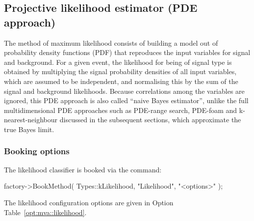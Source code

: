 \subsection{Projective likelihood estimator (PDE approach)}
\label{sec:likelihood}

The method of maximum likelihood consists of building a 
model out of probability density functions (PDF) that reproduces the input 
variables for signal and background. For a given event, the likelihood for 
being of signal type is obtained by multiplying the signal probability densities 
of all input variables, which are assumed to be independent, and normalising this 
by the sum of the signal and background likelihoods. Because correlations among 
the variables are ignored, this PDE approach is also called ``naive Bayes estimator'', 
unlike the full multidimensional PDE approaches such as PDE-range search, 
PDE-foam and k-nearest-neighbour discussed in the subsequent sections, which 
approximate the true Bayes limit. 

\subsubsection{Booking options}

The likelihood classifier is booked via the command:
\begin{codeexample}
\begin{tmvacode}
factory->BookMethod( Types::kLikelihood, "Likelihood", "<options>" );
\end{tmvacode}
\caption[.]{\codeexampleCaptionSize Booking of the (projective) likelihood classifier: 
         the first argument is the predefined enumerator, the 
         second argument is a user-defined string identifier, and the third argument 
         is the configuration options string. Individual options are separated by a ':'. 
         See Sec.~\ref{sec:usingtmva:booking} for more information on the booking.}
\end{codeexample}

The likelihood configuration options are given in Option 
Table~\ref{opt:mva::likelihood}.


